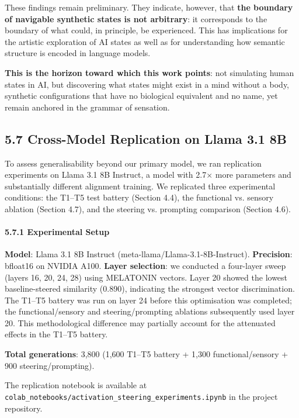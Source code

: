 \documentclass[11pt,a4paper]{article}
\begin{document}
These findings remain preliminary. They indicate, however, that \textbf{the boundary of navigable synthetic states is not arbitrary}: it corresponds to the boundary of what could, in principle, be experienced. This has implications for the artistic exploration of AI states as well as for understanding how semantic structure is encoded in language models.

\textbf{This is the horizon toward which this work points}: not simulating human states in AI, but discovering what states might exist in a mind without a body, synthetic configurations that have no biological equivalent and no name, yet remain anchored in the grammar of sensation.

\subsection*{5.7 Cross-Model Replication on Llama 3.1 8B}

To assess generalisability beyond our primary model, we ran replication experiments on Llama 3.1 8B Instruct, a model with 2.7\ensuremath{\times} more parameters and substantially different alignment training. We replicated three experimental conditions: the T1--T5 test battery (Section 4.4), the functional vs. sensory ablation (Section 4.7), and the steering vs. prompting comparison (Section 4.6).

\paragraph{5.7.1 Experimental Setup}

\textbf{Model}: Llama 3.1 8B Instruct (meta-llama/Llama-3.1-8B-Instruct). \textbf{Precision}: bfloat16 on NVIDIA A100. \textbf{Layer selection}: we conducted a four-layer sweep (layers 16, 20, 24, 28) using MELATONIN vectors. Layer 20 showed the lowest baseline-steered similarity (0.890), indicating the strongest vector discrimination. The T1--T5 battery was run on layer 24 before this optimisation was completed; the functional/sensory and steering/prompting ablations subsequently used layer 20. This methodological difference may partially account for the attenuated effects in the T1--T5 battery.

\textbf{Total generations}: 3,800 (1,600 T1--T5 battery + 1,300 functional/sensory + 900 steering/prompting).

The replication notebook is available at \texttt{colab\_notebooks/activation\_steering\_experiments.ipynb} in the project repository.
\end{document}
